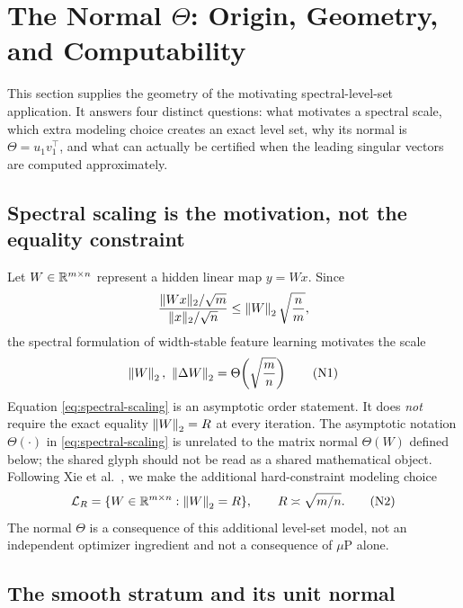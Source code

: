 \section{The Normal \texorpdfstring{\(\Theta\)}{Theta}: Origin, Geometry, and Computability}
\label{sec:normal-theta}

This section supplies the geometry of the motivating spectral-level-set
application.  It answers four distinct questions: what motivates a spectral
scale, which extra modeling choice creates an exact level set, why its normal is
\(\Theta=u_1v_1^\top\), and what can actually be certified when the leading
singular vectors are computed approximately.

\subsection{Spectral scaling is the motivation, not the equality constraint}

Let \(W\in\mathbb{R}^{m\times n}\) represent a hidden linear map \(y=Wx\).  Since
\[
 \frac{\|Wx\|_2/\sqrt m}{\|x\|_2/\sqrt n}
 \le \left\lVert W\right\rVert_{2}\sqrt{\frac nm},
\]
the spectral formulation of width-stable feature learning motivates the scale
\citep{yang2023spectral}
\begin{equation}
 \left\lVert W\right\rVert_{2},\ \left\lVert \Delta W\right\rVert_{2}
 =\Theta\!\left(\sqrt{\frac mn}\right)
\tag{N1}
\label{eq:spectral-scaling}
\end{equation}
Equation \eqref{eq:spectral-scaling} is an asymptotic order statement.  It does
\emph{not} require the exact equality \(\left\lVert W\right\rVert_{2}=R\) at every iteration.
The asymptotic notation \(\Theta(\cdot)\) in
\eqref{eq:spectral-scaling} is unrelated to the matrix normal
\(\Theta(W)\) defined below; the shared glyph should not be read as a shared
mathematical object.
Following Xie et al.~\cite{xie2026controlled}, we make the additional hard-constraint
modeling choice
\begin{equation}
 \mathcal L_R
 =
 \{W\in\mathbb{R}^{m\times n}:\left\lVert W\right\rVert_{2}=R\},
 \qquad
 R\asymp\sqrt{m/n}.
\tag{N2}
\label{eq:spectral-level-set}
\end{equation}
The normal \(\Theta\) is a consequence of this additional level-set model, not
an independent optimizer ingredient and not a consequence of \(\mu\)P alone.

\subsection{The smooth stratum and its unit normal}

